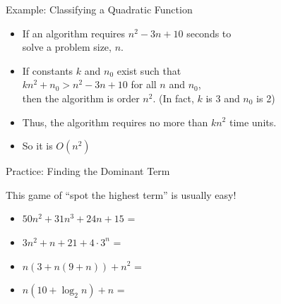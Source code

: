\documentclass[14pt,aspectratio=1610, hyperref={pdfpagelayout=SinglePage}]{beamer}
\begin{document}
\begin{frame}{Example: Classifying a Quadratic Function}
\begin{itemize}[<+->]
\item If an algorithm requires \(n^2 - 3n + 10\) seconds to\\ solve a problem size, \(n\).
\item If constants \(k\) and \(n_0\) exist such that \\
\(kn^2 + n_0 > n^2 - 3n + 10\) for all \(n\) and \(n_0\),\\
then the algorithm is order \(n^2\).  (In fact, \(k\) is 3 and \(n_0\) is 2)
\item Thus, the algorithm requires no more than \(kn^2\) time units.
\item So it is \(O(n^2)\)
\end{itemize}
\end{frame}


\begin{frame}{Practice: Finding the Dominant Term}

  This game of ``spot the highest term'' is usually easy!

  \begin{itemize}\setlength\itemsep{0.25em}
    \item \(50n^2 + 31n^3 + 24n + 15\) = 
    \item<3-> \(3n^2 + n + 21 + 4 \cdot 3^n\)  = 
  \end{itemize}\vspace{1em}

  \begin{itemize}\setlength\itemsep{0.25em}
    \item<6-> \(n\left(3 + n(9+n)\right) + n^2\) = 
    \item<8-> \(n\left(10 + \log_2n\right) + n\) = 
  \end{itemize}
\end{frame}
\end{document}
